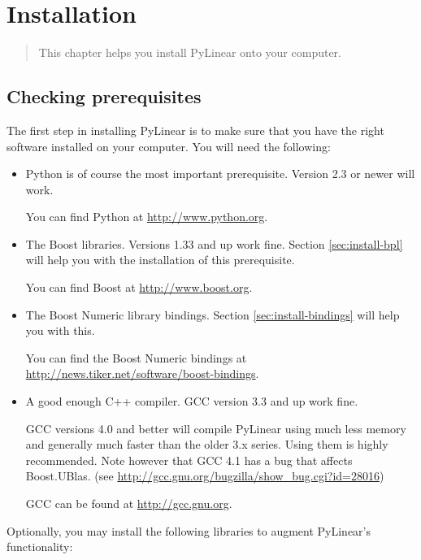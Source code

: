 \chapter{Installation}
\label{cha:installation}

\begin{quote}
   This chapter helps you install PyLinear onto your computer.
\end{quote}

\section{Checking prerequisites}
\label{sec:checking-prerequisites}

The first step in installing PyLinear is to make sure that you have the right
software installed on your computer. You will need the following:

\begin{itemize}
  \item Python is of course the most important prerequisite. 
    Version 2.3 or newer will work.

    You can find Python at \url{http://www.python.org}.
  \item The Boost libraries.
    Versions 1.33 and up work fine. Section \ref{sec:install-bpl}
    will help you with the installation of this prerequisite.

    You can find Boost at \url{http://www.boost.org}.
  \item The Boost Numeric library bindings. 
    Section \ref{sec:install-bindings} will help you with this.

    You can find the Boost Numeric bindings at
    \url{http://news.tiker.net/software/boost-bindings}.
  \item A good enough C++ compiler. GCC version 3.3 and up work fine.

    GCC versions 4.0 and better will compile PyLinear using much less memory
    and generally much faster than the older 3.x series.  Using them is highly
    recommended. Note however that GCC 4.1 has a
    bug that affects Boost.UBlas.
    (see \url{http://gcc.gnu.org/bugzilla/show_bug.cgi?id=28016})

    GCC can be found at \url{http://gcc.gnu.org}.
\end{itemize}

Optionally, you may install the following libraries to augment
PyLinear's functionality:


